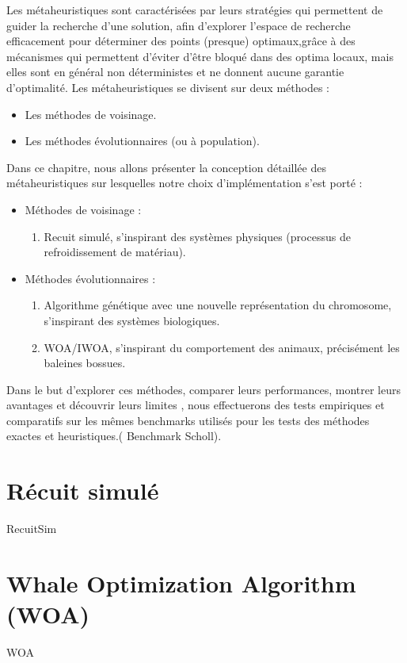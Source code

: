 \documentclass[12pt,a4paper, titlepage]{report}
\begin{document}
    Les métaheuristiques sont caractérisées par leurs stratégies qui permettent de guider la recherche d’une solution, afin d’explorer l’espace de recherche efficacement pour déterminer des points (presque) optimaux,grâce à des mécanismes qui permettent d’éviter d'être bloqué dans des optima locaux, mais elles sont en général non déterministes et ne donnent aucune garantie d’optimalité.
    Les métaheuristiques se divisent sur deux méthodes :
    \begin{itemize}
        \item Les méthodes de voisinage.
        \item Les méthodes évolutionnaires (ou à population).
    \end{itemize}
    Dans ce chapitre, nous allons présenter la conception détaillée des métaheuristiques sur lesquelles notre choix d’implémentation s’est porté :
    \begin{itemize}
        \item Méthodes de voisinage :
            \begin{enumerate}
                \item Recuit simulé, s’inspirant des systèmes physiques (processus de refroidissement de matériau).
            \end{enumerate}
        \item Méthodes évolutionnaires :
            \begin{enumerate}
                \item Algorithme génétique avec une nouvelle représentation du chromosome, s’inspirant des systèmes biologiques.
                \item WOA/IWOA, s’inspirant du comportement des animaux, précisément les baleines bossues.
            \end{enumerate}
    \end{itemize}
    Dans le but d’explorer ces méthodes, comparer leurs performances, montrer leurs avantages et découvrir leurs limites , nous effectuerons des tests empiriques et comparatifs sur les mêmes  benchmarks utilisés pour les tests des méthodes exactes et heuristiques.( Benchmark Scholl).
    \chapter{Récuit simulé }
    {RecuitSim}
    \chapter{Whale Optimization Algorithm (WOA)}
    {WOA}
\end{document}

